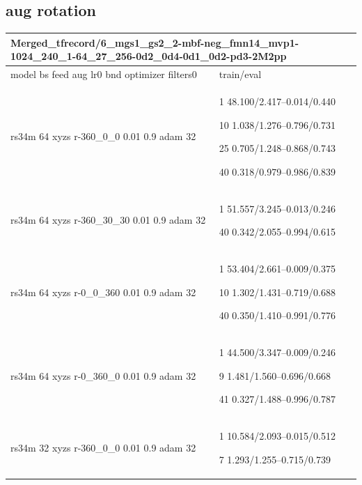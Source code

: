 \documentclass[,table,dvipsnames]{article}
\begin{document}
\subsection{aug rotation}
\noindent\begin{tabular}{|p{9cm}|p{6cm}| }	
	\hline
	\multicolumn{2}{|p{15cm}|}{Merged\_tfrecord/6\_mgs1\_gs2\_2-mbf-neg\_fmn14\_mvp1-1024\_240\_1-64\_27\_256-0d2\_0d4-0d1\_0d2-pd3-2M2pp}\\
	\hline
	model bs feed aug lr0 bnd optimizer filters0 & train/eval \\
	 
	
	\rowcolor{green!20}
	rs34m 64 xyzs r-360\_0\_0 0.01 0.9 adam 32& 1 48.100/2.417--0.014/0.440\par 10 1.038/1.276--0.796/0.731\par 25 0.705/1.248--0.868/0.743\par 40 0.318/0.979--0.986/0.839\\
	
	\rowcolor{yellow!20}
	rs34m 64 xyzs r-360\_30\_30 0.01 0.9 adam 32& 1 51.557/3.245--0.013/0.246\par 40 0.342/2.055--0.994/0.615\\
		
	\rowcolor{blue!20}
	rs34m 64 xyzs r-0\_0\_360 0.01 0.9 adam 32& 1 53.404/2.661--0.009/0.375\par 10 1.302/1.431--0.719/0.688\par 40 0.350/1.410--0.991/0.776\\ 
	
	\rowcolor{red!20}
	rs34m 64 xyzs r-0\_360\_0 0.01 0.9 adam 32& 1 44.500/3.347--0.009/0.246\par 9 1.481/1.560--0.696/0.668\par 41 0.327/1.488--0.996/0.787\\
	
	\rowcolor{green!20}
	rs34m 32 xyzs r-360\_0\_0 0.01 0.9 adam 32& 1 10.584/2.093--0.015/0.512\par 7 1.293/1.255--0.715/0.739\\
	\hline
	
\end{tabular}
\end{document}
